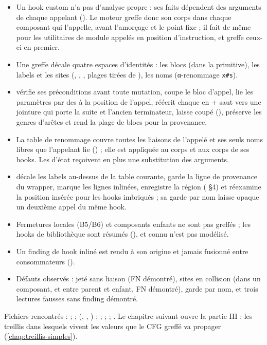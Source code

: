 \begin{resume}
\begin{itemize}
  \item Un hook custom n'a pas d'analyse propre : ses faits dépendent des arguments de chaque appelant (). Le moteur greffe donc son corps dans chaque composant qui l'appelle, avant l'amorçage et le point fixe ; il fait de même pour les utilitaires de module appelés en position d'instruction, et greffe ceux-ci en premier.
  \item Une greffe décale quatre espaces d'identités : les blocs (dans la primitive), les labels et les sites (, , , plages tirées de ), les noms (α-renommage \texttt{x\#s}).
  \item {} vérifie ses préconditions avant toute mutation, coupe le bloc d'appel, lie les paramètres par des  à la position de l'appel, réécrit chaque  en  + saut vers une jointure qui porte la suite et l'ancien terminateur, laisse  coupé (), préserve les genres d'arêtes et rend la plage de blocs pour la provenance.
  \item La table de renommage couvre toutes les liaisons de l'appelé et ses seuls noms libres que l'appelant lie () ; elle est appliquée au corps et aux corps de ses hooks. Les  d'état reçoivent en plus une substitution des arguments.
  \item {} décale les labels au-dessus de la table courante, garde la ligne de provenance du wrapper, marque les lignes inlinées, enregistre la région ( §4) et réexamine la position insérée pour les hooks imbriqués ; sa garde par nom laisse opaque un deuxième appel du même hook.
  \item Fermetures locales (B5/B6) et composants enfants ne sont pas greffés ; les hooks de bibliothèque sont résumés (), et \og connu n'est pas modélisé\fg{}.
  \item Un finding de hook inliné est rendu à son origine et jamais fusionné entre consommateurs ().
  \item Défauts observés :  jeté sans liaison (FN démontré), sites en collision (dans un composant, et entre parent et enfant, FN \Error{} démontré), garde par nom, et trois lectures fausses sans finding démontré.
\end{itemize}
{\sloppy Fichiers rencontrés :  ;  ;  (, , ) ;  ;  ;  ; . Le chapitre suivant ouvre la partie III : les treillis dans lesquels vivent les valeurs que le CFG greffé va propager (\cref{chap:treillis-simples}).\par}
\end{resume}

